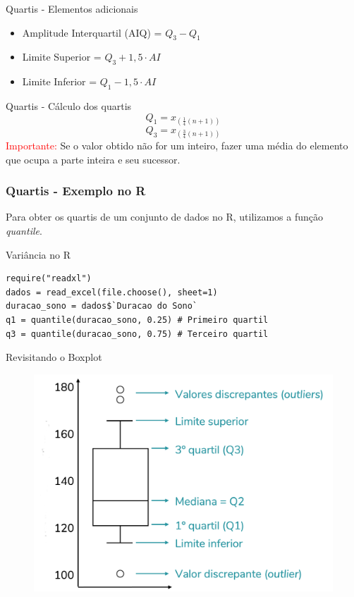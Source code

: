 \begin{frame}{Quartis - Elementos adicionais}
    \begin{itemize}
        \item Amplitude Interquartil (AIQ) = $Q_3 - Q_1$
        \pause
        \item Limite Superior = $Q_3 + 1,5 \cdot AI$
        \pause
        \item Limite Inferior = $Q_1 - 1,5 \cdot AI$
    \end{itemize}
   
\end{frame}

\begin{frame}{Quartis - Cálculo dos quartis}
    $$Q_1 = x_{\left(\frac{1}{4}(n+1) \right)}$$
    \pause
    $$Q_3 =  x_{\left(\frac{3}{4}(n+1)\right)} $$
    \textcolor{red}{Importante:} Se o valor obtido não for um inteiro, fazer uma média do elemento que ocupa a parte inteira e seu sucessor.
\end{frame}

\begin{frame}[fragile]
\frametitle{Quartis - Exemplo no R}   
Para obter os quartis de um conjunto de dados no R, utilizamos a função \textit{quantile}.
\begin{block}{Variância no R}
\begin{verbatim}
require("readxl")
dados = read_excel(file.choose(), sheet=1) 
duracao_sono = dados$`Duracao do Sono`
q1 = quantile(duracao_sono, 0.25) # Primeiro quartil
q3 = quantile(duracao_sono, 0.75) # Terceiro quartil
\end{verbatim}
\end{block}
\end{frame}

\begin{frame}{Revisitando o Boxplot}
    \begin{figure}
    \centering
    \includegraphics[width=0.6\linewidth]{figures/boxplot.png}    
    \end{figure}
\end{frame}

